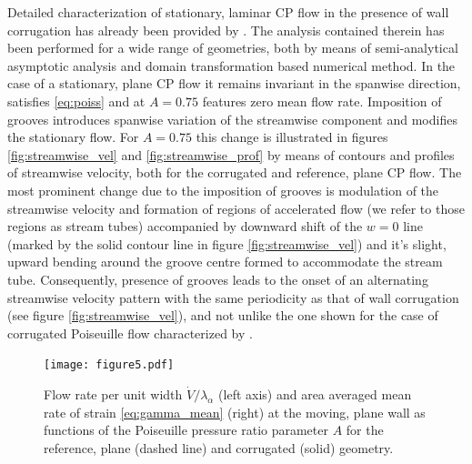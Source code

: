 \documentclass[lineno]{jfm}
\begin{document}
Detailed characterization of stationary, laminar CP flow in the presence of wall corrugation has already been provided by \citet{mohammadi2014effects}. The analysis contained therein has been performed for a wide range of geometries, both by means of semi-analytical asymptotic analysis and domain transformation based numerical method.
In the case of a stationary, plane CP flow it remains invariant in the spanwise direction, satisfies \eqref{eq:poiss} and at $A=0.75$ features zero mean flow rate.
Imposition of grooves introduces spanwise variation of the streamwise component and modifies the stationary flow.
For $A=0.75$ this change is illustrated in figures \ref{fig:streamwise_vel} and \ref{fig:streamwise_prof} by means of contours and profiles of streamwise velocity,
both for the corrugated and reference, plane CP flow.
The most prominent change due to the imposition of grooves is modulation of the streamwise velocity and formation of regions of accelerated flow (we refer to those regions as stream tubes) accompanied by downward shift of the $w=0$ line (marked by the solid contour line in figure \ref{fig:streamwise_vel}) and it's slight, upward bending around the groove centre formed to accommodate the stream tube.
Consequently, presence of grooves leads to the onset of an alternating streamwise velocity pattern with the same periodicity as that of wall corrugation (see figure \ref{fig:streamwise_vel}), and not unlike the one shown for the case of corrugated Poiseuille flow characterized by \citet{Nikesh2017}.

\begin{figure}
\centering
 \texttt{[image: figure5.pdf]}  
 \caption{Flow rate per unit width $\Dot{V}/\lambda_\alpha$ (left axis) and area averaged mean rate of strain \eqref{eq:gamma_mean} (right) at the moving, plane wall as functions of the Poiseuille pressure ratio parameter $A$ for the reference, plane (dashed line) and corrugated (solid) geometry.}
 \label{fig:flowRate_avgStrain}
\end{figure}
\end{document}
